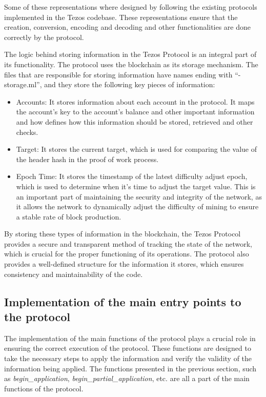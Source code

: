 Some of these representations where designed by following the existing protocols implemented in the Tezos codebase. These representations ensure that the creation, conversion, encoding and decoding and other functionalities are done correctly by the protocol.

The logic behind storing information in the Tezos Protocol is an integral part of its functionality. The protocol uses the blockchain as its storage mechanism. 
The files that are responsible for storing information have names ending with ``-storage.ml'', and they store the following key pieces of information:
\begin{itemize}
    \item Accounts: It stores information about each account in the protocol. It maps the account's key to the account's balance and other important information and how defines how this information should be stored, retrieved and other checks.

    \item Target: It stores the current target, which is used for comparing the value of the header hash in the proof of work process.

    \item Epoch Time: It stores the timestamp of the latest difficulty adjust epoch, which is used to determine when it's time to adjust the target value. This is an important part of maintaining the security and integrity of the network, as it allows the network to dynamically adjust the difficulty of mining to ensure a stable rate of block production.
\end{itemize}

By storing these types of information in the blockchain, the Tezos Protocol provides a secure and transparent method of tracking the state of the network, which is crucial for the proper functioning of its operations. The protocol also provides a well-defined structure for the information it stores, which ensures consistency and maintainability of the code.

\subsection*{Implementation of the main entry points to the protocol}

The implementation of the main functions of the protocol plays a crucial role in ensuring the correct execution of the protocol. These functions are designed to take the necessary steps to apply the information and verify the validity of the information being applied. The functions presented in the previous section, such as \emph{begin\_application}, \emph{begin\_partial\_application}, etc. are all a part of the main functions of the protocol.

